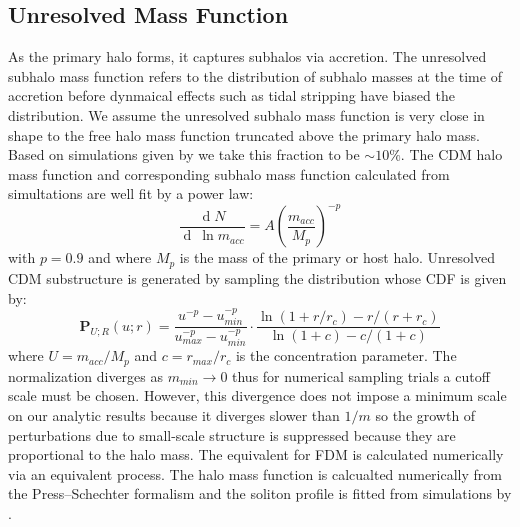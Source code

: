 \documentclass[usenatbib]{mnras}
\renewcommand{\d}[1]{\ensuremath{\operatorname{d}\!{#1}}}
\begin{document}
\subsection{Unresolved Mass Function}

	As the primary halo forms, it captures subhalos via accretion. The unresolved subhalo mass function refers to the distribution of subhalo masses at the time of accretion before dynmaical effects such as tidal stripping have biased the distribution. We assume the unresolved subhalo mass function is very close in shape to the free halo mass function truncated above the primary halo mass. Based on simulations given by \citet{dark_wave} we take this fraction to be $\sim 10\%$. The CDM halo mass function and corresponding subhalo mass function calculated from simultations \citep{pop_of_subhalos, unified_model} are well fit by a power law: 
\begin{equation}
\frac{\d{N}}{\d{\: \ln{m_{acc}}}} = A \left(\frac{m_{acc}}{M_p} \right)^{-p}
\end{equation}
with $p = 0.9$ and where $M_p$ is the mass of the primary or host halo. Unresolved CDM substructure is generated by sampling the distribution whose CDF is given by:
\begin{equation} \label{dist}
\mathbf{P}_{U;R}(u;r) = \frac{u^{-p} - u_{min}^{-p}}{u_{max}^{-p} - u_{min}^{-p}} \cdot \frac{\ln{(1+r/r_c)} - r/(r+r_c)}{\ln{(1+c)} - c/(1+c)} 
\end{equation}     
where $U = m_{acc}/M_p$ and $c = r_{max}/r_c$ is the concentration parameter. The normalization diverges as $m_{min} \to 0$ thus for numerical sampling trials a cutoff scale must be chosen. However, this divergence does not impose a minimum scale on our analytic results because it diverges slower than $1/m$ so the growth of perturbations due to small-scale structure is suppressed because they are proportional to the halo mass. The equivalent for FDM is calculated numerically via an equivalent process. The halo mass function is calcualted numerically from the Press--Schechter formalism \citep{substructure_FDM, marsh} and the soliton profile is fitted from simulations by \cite{schive_solitons}.
\end{document}
